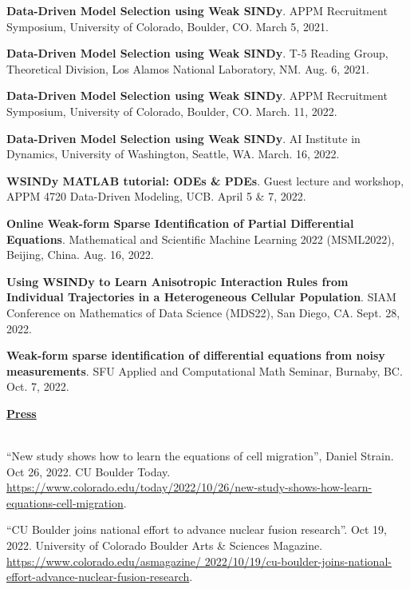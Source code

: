 \documentclass[letterpaper,11pt,oneside]{article}
\newcommand{\headr}[1]{\vspace{10pt}\uline{\Large{\textbf{#1}} \hfill } \\ \vspace{-10pt}\\}
\begin{document}
\begin{enumerate}[label={[\arabic*]}]
\item \textbf{Data-Driven Model Selection using Weak SINDy}. APPM Recruitment Symposium, University of Colorado, Boulder, CO. March 5, 2021.
\item \textbf{Data-Driven Model Selection using Weak SINDy}. T-5 Reading Group, Theoretical Division, Los Alamos National Laboratory, NM. Aug. 6, 2021.
\item \textbf{Data-Driven Model Selection using Weak SINDy}. APPM Recruitment Symposium, University of Colorado, Boulder, CO. March. 11, 2022.
\item \textbf{Data-Driven Model Selection using Weak SINDy}. AI Institute in Dynamics, University of Washington, Seattle, WA. March. 16, 2022.
\item \textbf{WSINDy MATLAB tutorial: ODEs \& PDEs}. Guest lecture and workshop, APPM 4720 Data-Driven Modeling, UCB. April 5 \& 7, 2022.
\item \textbf{Online Weak-form Sparse Identification of Partial Differential Equations}. Mathematical and Scientific Machine Learning 2022 (MSML2022), Beijing, China. Aug. 16, 2022.
\item \textbf{Using WSINDy to Learn Anisotropic Interaction 
Rules from Individual Trajectories in a Heterogeneous Cellular Population}. SIAM Conference on Mathematics of Data Science (MDS22), San Diego, CA. Sept. 28, 2022.
\item \textbf{Weak-form sparse identification of differential equations from noisy measurements}. SFU Applied and Computational Math Seminar, Burnaby, BC. Oct. 7, 2022.
\end{enumerate}

\headr{Press}

\begin{sloppypar}
\begin{enumerate}[label={[\arabic*]}]
\item \raggedright``New study shows how to learn the equations of cell migration'', Daniel Strain. Oct 26, 2022. CU Boulder Today. \url{https://www.colorado.edu/today/2022/10/26/new-study-shows-how-learn-equations-cell-migration}.
\item 
``CU Boulder joins national effort to advance nuclear fusion research''. Oct 19, 2022. University of Colorado Boulder Arts \& Sciences Magazine. \url{https://www.colorado.edu/asmagazine/
2022/10/19/cu-boulder-joins-national-effort-advance-nuclear-fusion-research}.
\end{enumerate}
\end{sloppypar}
\end{document}
